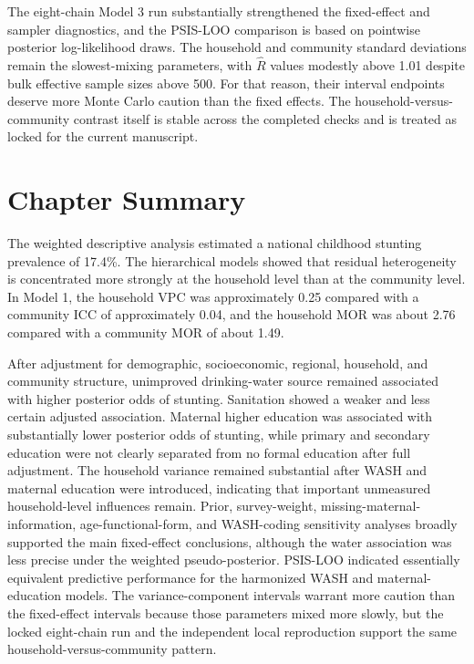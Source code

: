 The eight-chain Model 3 run substantially strengthened the fixed-effect and sampler diagnostics, and the PSIS-LOO comparison is based on pointwise posterior log-likelihood draws. The household and community standard deviations remain the slowest-mixing parameters, with $\hat R$ values modestly above 1.01 despite bulk effective sample sizes above 500. For that reason, their interval endpoints deserve more Monte Carlo caution than the fixed effects. The household-versus-community contrast itself is stable across the completed checks and is treated as locked for the current manuscript.

\section{Chapter Summary}

The weighted descriptive analysis estimated a national childhood stunting prevalence of 17.4\%. The hierarchical models showed that residual heterogeneity is concentrated more strongly at the household level than at the community level. In Model 1, the household VPC was approximately 0.25 compared with a community ICC of approximately 0.04, and the household MOR was about 2.76 compared with a community MOR of about 1.49.

After adjustment for demographic, socioeconomic, regional, household, and community structure, unimproved drinking-water source remained associated with higher posterior odds of stunting. Sanitation showed a weaker and less certain adjusted association. Maternal higher education was associated with substantially lower posterior odds of stunting, while primary and secondary education were not clearly separated from no formal education after full adjustment. The household variance remained substantial after WASH and maternal education were introduced, indicating that important unmeasured household-level influences remain. Prior, survey-weight, missing-maternal-information, age-functional-form, and WASH-coding sensitivity analyses broadly supported the main fixed-effect conclusions, although the water association was less precise under the weighted pseudo-posterior. PSIS-LOO indicated essentially equivalent predictive performance for the harmonized WASH and maternal-education models. The variance-component intervals warrant more caution than the fixed-effect intervals because those parameters mixed more slowly, but the locked eight-chain run and the independent local reproduction support the same household-versus-community pattern.

